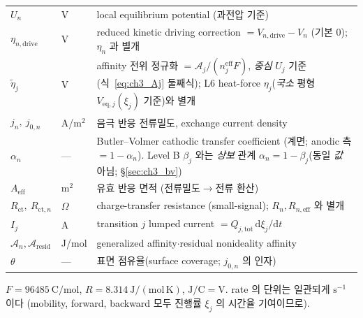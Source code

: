 \documentclass[11pt,a4paper]{article}
\newcommand{\dd}{\mathrm{d}}
\newcommand{\eff}{\mathrm{eff}}
\newcommand{\eq}{\mathrm{eq}}
\newcommand{\drive}{\mathrm{drive}}
\newcommand{\tot}{\mathrm{tot}}
\newcommand{\ct}{\mathrm{ct}}
\newcommand{\resid}{\mathrm{resid}}
\begin{document}
\begin{longtable}{p{} p{} >{\raggedright\arraybackslash}p{}}
$U_n$ & V & local equilibrium potential (과전압 기준) \\
$\eta_{n,\drive}$ & V & reduced kinetic driving correction $=V_{n,\drive}-V_n$ (기본 $0$); $\eta_n$ 과 별개 \\
$\tilde\eta_j$ & V & affinity 전위 정규화 $=\mathcal A_j/(n_j^\eff F)$, \emph{중심} $U_j$ 기준(식~\eqref{eq:ch3_Aj} 둘째식); L6 heat-force $\eta_j$(\emph{국소} 평형 $V_{\eq,j}(\xi_j)$ 기준)와 별개 \\
$j_n,\ j_{0,n}$ & A/m$^2$ & 음극 반응 전류밀도, exchange current density \\
$\alpha_n$ & --- & Butler--Volmer cathodic transfer coefficient (계면; anodic 측 $=1-\alpha_n$). Level B $\beta_j$ 와는 \emph{상보} 관계 $\alpha_n=1-\beta_j$(동일 \emph{값} 아님; \S\ref{sec:ch3_bv}) \\
$A_\eff$ & m$^2$ & 유효 반응 면적 (전류밀도$\to$전류 환산) \\
$R_\ct,\ R_{\ct,n}$ & $\Omega$ & charge-transfer resistance (small-signal); $R_n,R_{n,\eff}$ 와 별개 \\
$I_j$ & A & transition $j$ lumped current $=Q_{j,\tot}\,\dd\xi_j/\dd t$ \\
$\mathcal A_n,\mathcal A_{\resid}$ & J/mol & generalized affinity$\cdot$residual nonideality affinity \\
$\theta$ & --- & 표면 점유율(surface coverage; $j_{0,n}$ 의 인자) \\
\bottomrule
\end{longtable}
$F=96485\ \mathrm{C/mol}$, $R=8.314\ \mathrm{J/(mol\,K)}$, $\mathrm{J/C}=\mathrm V$. rate 의 단위는
일관되게 $\mathrm{s^{-1}}$ 이다 (mobility, forward, backward 모두 진행률 $\xi_j$ 의 시간율 기여이므로).

\end{document}
